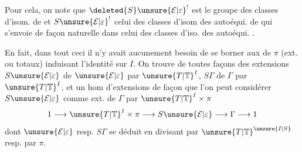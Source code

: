 Pour cela, on note que $\deleted{S}\unsure{\mathcal E|\varepsilon}^{!}$ est le groupe des classes d'isom.  de
et $S\unsure{\mathcal E|\varepsilon}^{!}$ celui des classes d'isom des  autoéqui. de
qui s'envoie de façon naturelle dans celui des classes d'iso. des autoéqui.  
.


En fait, dans tout ceci il n'y avait aucunement besoin de se borner aux   de $\pi$ (ext. ou totaux) induisant l'identité sur $I$. On trouve de toutes façons des extensions $S\unsure{\mathcal E|\varepsilon}$ de $\unsure{\mathcal E|\varepsilon}$ par $\unsure{T|\mathbb T}^I$, $S\Gamma$ de $\Gamma$ par $\unsure{T|\mathbb T}^I$, et un hom d'extensions
de façon que l'on peut considérer $S\unsure{\mathcal E|\varepsilon}$ comme ext. de $\Gamma$ par $\unsure{T|\mathbb T}^I\times\pi$
\[
1\longrightarrow \unsure{T|\mathbb T}^I\times\pi\longrightarrow S\unsure{\mathcal E|\varepsilon}\longrightarrow\Gamma\longrightarrow1
\]
dont  $\unsure{\mathcal E|\varepsilon}$ resp. $S\Gamma$ se déduit en divisant par $\unsure{T|\mathbb T}^{\unsure{I|S}}$ resp. par $\pi$.

